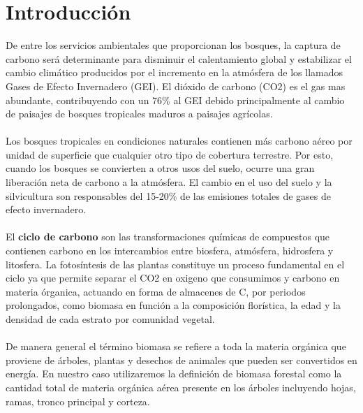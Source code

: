 \newpage{\ } 
\thispagestyle{empty} 

\chapter{Introducción}

De entre los servicios ambientales que proporcionan los bosques, la captura de carbono ser\'a determinante para disminuir el calentamiento global y estabilizar el cambio clim\'atico producidos por el incremento en la atmósfera de los llamados Gases de Efecto Invernadero (GEI). El di\'oxido de carbono (CO2) es el gas mas abundante, contribuyendo con un 76\% al GEI \cite{avila2001almacenamiento} debido principalmente al cambio de paisajes de bosques tropicales maduros a paisajes agr\'icolas.\\~\\
Los bosques tropicales en condiciones naturales contienen m\'as carbono a\'ereo por unidad de superficie que cualquier otro tipo de cobertura terrestre. Por esto, cuando los bosques se convierten a otros usos del suelo, ocurre una gran liberaci\'on neta de carbono a la atm\'osfera. El cambio en el uso del suelo y la silvicultura son responsables del 15-20\% de las emisiones totales de gases de efecto invernadero\cite{peralta2013analisis}.\\~\\
El \textbf{ciclo de carbono} son las transformaciones qu\'imicas de compuestos que contienen carbono en los intercambios entre biosfera, atm\'osfera, hidrosfera y litosfera. La fotosíntesis de las plantas constituye un proceso fundamental en el ciclo ya que permite separar  el CO2 en oxigeno que consumimos y carbono en materia \'organica, actuando en forma de almacenes de C, por periodos prolongados, como biomasa en función a la composición flor\'istica, la edad y la densidad de cada estrato por comunidad vegetal\cite{acosta2003diseno}.\\~\\
De manera general el t\'ermino biomasa se refiere a toda la materia org\'anica que proviene de \'arboles, plantas y desechos de animales que pueden ser convertidos en energ\'ia. En nuestro caso utilizaremos la definici\'on de biomasa forestal como la cantidad total de materia org\'anica a\'erea presente en los \'arboles incluyendo hojas, ramas, tronco principal y corteza\cite{garzuglia2003wood}.



